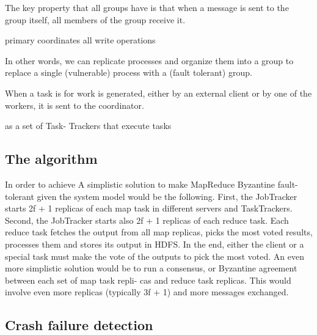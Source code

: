 \documentclass[sigchi]{acmart}
\begin{document}
\begin{description}
The key property that all groups have is that when a
message is sent to the group itself, all members of the group receive it.


 primary coordinates all write
operations


 In other words, we can replicate processes and organize them into a group to replace a single (vulnerable) process with a (fault tolerant) group.



 When a task is  for work is generated, either
by an external client or by one of the workers, it is sent to the coordinator.





as  a set of Task- Trackers that execute tasks
\end{description}


























 

\subsection{The algorithm}

In order to achieve 
A simplistic solution to make MapReduce
Byzantine fault-tolerant given the system model would be the
following. First, the JobTracker starts 2f + 1 replicas of each
map task in different servers and TaskTrackers. Second, the
JobTracker starts also 2f + 1 replicas of each reduce task.
Each reduce task fetches the output from all map replicas,
picks the most voted results, processes them and stores its
output in HDFS. In the end, either the client or a special task
must make the vote of the outputs to pick the most voted. An
even more simplistic solution would be to run a consensus,
or Byzantine agreement between each set of map task repli-
cas and reduce task replicas. This would involve even more
replicas (typically 3f + 1) and more messages exchanged.




\subsection{Crash failure detection}
\end{document}
